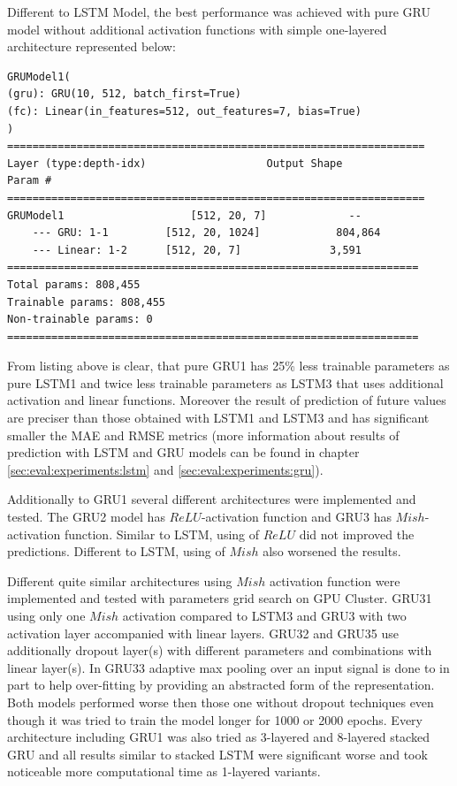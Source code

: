 Different to LSTM Model, the best performance was achieved with pure GRU model without additional activation functions with simple one-layered architecture represented below:
\begin{lstlisting}[caption={GRU1 with Sliding Window},captionpos=b]
GRUModel1(
(gru): GRU(10, 512, batch_first=True)
(fc): Linear(in_features=512, out_features=7, bias=True)
)
==================================================================
Layer (type:depth-idx)                   Output Shape              Param #
==================================================================
GRUModel1                    [512, 20, 7]             --
	--- GRU: 1-1         [512, 20, 1024]            804,864
	--- Linear: 1-2      [512, 20, 7]              3,591
=================================================================
Total params: 808,455
Trainable params: 808,455
Non-trainable params: 0
=================================================================
\end{lstlisting}

From listing above is clear, that pure GRU1 has 25\% less trainable parameters as pure LSTM1 and twice less trainable parameters as LSTM3 that uses additional activation and linear functions. Moreover the result of prediction of future values are preciser than those obtained with LSTM1 and LSTM3 and has significant smaller the MAE and RMSE metrics (more information about results of prediction with LSTM and GRU models can be found in chapter \ref{sec:eval:experiments:lstm} and \ref{sec:eval:experiments:gru}). 

Additionally to GRU1 several different architectures were implemented and tested. The GRU2 model has $ReLU$-activation function and GRU3 has $Mish$-activation function. Similar to LSTM, using of $ReLU$ did not improved the predictions. Different to LSTM, using of $Mish$ also worsened the results.     

Different quite similar architectures using $Mish$ activation function were implemented and tested with parameters grid search on GPU Cluster. GRU31 using only one $Mish$ activation compared to LSTM3 and GRU3 with two activation layer accompanied with linear layers. GRU32 and GRU35 use additionally dropout layer(s) with different parameters and combinations with linear layer(s). In GRU33 adaptive max pooling over an input signal is done to in part to help over-fitting by providing an abstracted form of the representation. Both models performed worse then those one without dropout techniques even though it was tried to train the model longer for 1000 or 2000 epochs. Every architecture including GRU1 was also tried as 3-layered and 8-layered stacked GRU and all results similar to stacked LSTM were significant worse and took noticeable more computational time as 1-layered variants.


